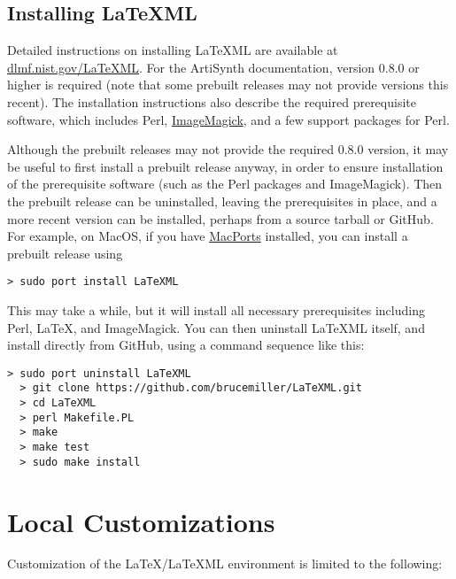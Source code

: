 \documentclass{article}
\begin{document}
\subsection{Installing LaTeXML}

Detailed instructions on installing LaTeXML are available at
\href{http://dlmf.nist.gov/LaTeXML/}{dlmf.nist.gov/LaTeXML}.  For the
ArtiSynth documentation, version 0.8.0 or higher is required (note
that some prebuilt releases may not provide versions this recent).
The installation instructions also describe the required prerequisite
software, which includes Perl,
\href{http://www.imagemagick.org}{ImageMagick}, and a few support
packages for Perl.

Although the prebuilt releases may not provide the required 0.8.0
version, it may be useful to first install a prebuilt release anyway,
in order to ensure installation of the prerequisite software (such as
the Perl packages and ImageMagick). Then the prebuilt release can be
uninstalled, leaving the prerequisites in place, and a more recent
version can be installed, perhaps from a source tarball or GitHub. For
example, on MacOS, if you have
\href{http://www.macports.org}{MacPorts} installed, you can install a
prebuilt release using

\begin{lstlisting}[]
  > sudo port install LaTeXML
\end{lstlisting}

This may take a while, but it will install all necessary prerequisites
including Perl, LaTeX, and ImageMagick. You can then uninstall LaTeXML
itself, and install directly from GitHub, using a command
sequence like this:

\begin{lstlisting}[]
  > sudo port uninstall LaTeXML
  > git clone https://github.com/brucemiller/LaTeXML.git
  > cd LaTeXML
  > perl Makefile.PL
  > make
  > make test
  > sudo make install
\end{lstlisting}

\section{Local Customizations}
\label{LocalCustomizationSec}

Customization of the LaTeX/LaTeXML environment is limited to the
following:
\end{document}
